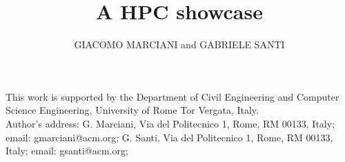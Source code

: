 \documentclass[acmutv-cw-mcmcp]{acmlarge}
\title{A HPC showcase}
\author{GIACOMO MARCIANI and GABRIELE SANTI \affil{University of Rome Tor Vergata}}
\numberwithin{equation}{section}
\begin{document}
\begin{bottomstuff}
	This work is supported by the Department of Civil Engineering and Computer Science
	Engineering, University of Rome Tor Vergata, Italy.\\
	Author's address:
	G. Marciani, Via del Politecnico 1, Rome, RM 00133, Italy;
	email: gmarciani@acm.org;
	G. Santi, Via del Politecnico 1, Rome, RM 00133, Italy;
	email: gsanti@acm.org;
\end{bottomstuff}

\maketitle








\elecappendix

\end{document}
